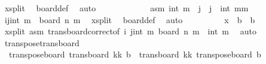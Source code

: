 \begin{isabellebody}
\ x{\isacharunderscore}{\kern0pt}split\ \isamarkupfalse%
\ board{\isacharunderscore}{\kern0pt}def\ \isamarkupfalse%
\ auto\isanewline
\ \ \ \ \isamarkupfalse%
\isanewline
\ \ \ \ \ \ \isamarkupfalse%
\ asm{\isacharcolon}{\kern0pt}\ {\isachardoublequoteopen}int\ m\ {\isacharless}{\kern0pt}\ j\ {\isasymand}\ j\ {\isasymle}\ int\ {\isacharparenleft}{\kern0pt}mm\isanewline
\ \ \ \ \ \ \isamarkupfalse%
\ \isamarkupfalse%
\ {\isachardoublequoteopen}{\isacharparenleft}{\kern0pt}i{\isacharcomma}{\kern0pt}j{\isacharminus}{\kern0pt}int\ m\ {\isasymin}\ board\ n\ m\ \isamarkupfalse%
\ x{\isacharunderscore}{\kern0pt}split\ \isamarkupfalse%
\ board{\isacharunderscore}{\kern0pt}def\ \isamarkupfalse%
\ auto\isanewline
\ \ \ \ \ \ \isamarkupfalse%
\ \isamarkupfalse%
\ {\isachardoublequoteopen}x\ {\isasymin}\ {\isacharquery}{\kern0pt}b{}\ {\isasymunion}\ {\isacharquery}{\kern0pt}b{}{\isachardoublequoteclose}\ \isanewline
\ \ \ \ \ \ \ \ \isamarkupfalse%
\ x{\isacharunderscore}{\kern0pt}split\ asm\ trans{\isacharunderscore}{\kern0pt}board{\isacharunderscore}{\kern0pt}correct{\isacharbrackleft}{\kern0pt}of\ i\ {\isachardoublequoteopen}j{\isacharminus}{\kern0pt}int\ m\ {\isachardoublequoteopen}board\ n\ m\ {}\ {\isachardoublequoteopen}int\ m\ \isamarkupfalse%
\ auto\isanewline
\ \ \ \ \isamarkupfalse%
\isanewline
\ \ \isamarkupfalse%
\isanewline
{}\isamarkupfalse%
%
\endisatagproof
{\isafoldproof}%
%
\isadelimproof
\isanewline
%
\endisadelimproof
\isanewline
{}\isamarkupfalse%
\ transpose{\isacharunderscore}{\kern0pt}trans{\isacharunderscore}{\kern0pt}board{\isacharcolon}{\kern0pt}\ \isanewline
\ \ {\isachardoublequoteopen}transpose{\isacharunderscore}{\kern0pt}board\ {\isacharparenleft}{\kern0pt}trans{\isacharunderscore}{\kern0pt}board\ {\isacharparenleft}{\kern0pt}kk\ b{\isacharparenright}{\kern0pt}\ {\isacharequal}{\kern0pt}\ trans{\isacharunderscore}{\kern0pt}board\ {\isacharparenleft}{\kern0pt}kk\ {\isacharparenleft}{\kern0pt}transpose{\isacharunderscore}{\kern0pt}board\ b{\isacharparenright}{\kern0pt}{\isachardoublequoteclose}\isanewline

\end{isabellebody}
